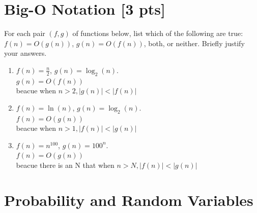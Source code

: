 \documentclass[a4paper]{article}
\theoremstyle{definition}
\newenvironment{soln}{
    \leavevmode\color{blue}\ignorespaces
}{}
\begin{document}
\section{Big-O Notation [3 pts]}
For each pair $(f, g)$ of functions below, list which of the following
are true: $f(n) = O(g(n))$, $g(n) = O(f(n))$, both, or
neither. Briefly justify your answers.
\begin{enumerate}
	\item 	$f(n) = \frac{n}{2}$, $g(n) = \log_{2}(n)$.\\
	    \begin{soln}  $g(n) = O(f(n))$\\beacue when $ n>2, |g(n)|<|f(n)|$ \end{soln}
	\item 	$f(n) = \ln(n)$, $g(n) = \log_{2}(n)$.\\
	    \begin{soln}  $f(n) = O(g(n))$\\beacue when $n>1, |f(n)|<|g(n)|$ \end{soln}
	\item 	$f(n) = n^{100}$, $g(n) = 100^n$.\\
	    \begin{soln}  $f(n) = O(g(n))$\\beacue there is an N that when $n>N, |f(n)|<|g(n)|$ \end{soln}
\end{enumerate}





\section{Probability and Random Variables }
\end{document}
